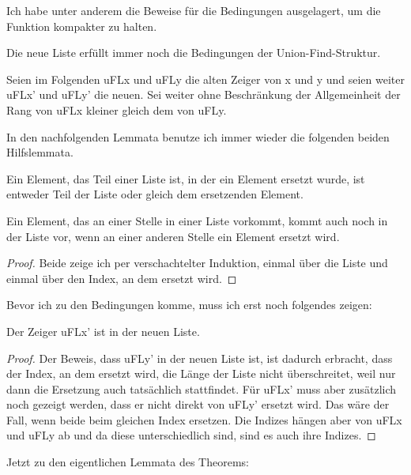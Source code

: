 Ich habe unter anderem die Beweise für die \KruskalunionFind Bedingungen ausgelagert, um die Funktion kompakter zu halten.

\begin{theorem}
  Die neue Liste erfüllt immer noch die Bedingungen der Union-Find-Struktur.
\end{theorem}

Seien im Folgenden uFLx und uFLy die alten Zeiger von x und y und seien weiter uFLx' und uFLy' die neuen.
Sei weiter ohne Beschränkung der Allgemeinheit der Rang von uFLx kleiner gleich dem von uFLy.

In den nachfolgenden Lemmata benutze ich immer wieder die folgenden beiden Hilfslemmata.

\begin{lemma}[\memoreqofmemset]\label{memoreqofmemset}
  Ein Element, das Teil einer Liste ist, in der ein Element ersetzt wurde, ist entweder Teil der Liste oder gleich dem ersetzenden Element.
\end{lemma}
\begin{lemma}[\memsetofneindex]
  Ein Element, das an einer Stelle in einer Liste vorkommt, kommt auch noch in der Liste vor, wenn an einer anderen Stelle ein Element ersetzt wird.
\end{lemma}
\begin{proof}
  Beide zeige ich per verschachtelter Induktion, einmal über die Liste und einmal über den Index, an dem ersetzt wird.
\end{proof}

Bevor ich zu den \KruskalunionFind Bedingungen komme, muss ich erst noch folgendes zeigen:

\begin{lemma}[\KruskalupdateunionFindhuFLxprimein]
  Der Zeiger uFLx' ist in der neuen Liste.
\end{lemma}
\begin{proof}
  Der Beweis, dass uFLy' in der neuen Liste ist, ist dadurch erbracht, dass der Index, an dem ersetzt wird, die Länge der Liste nicht überschreitet,
  weil nur dann die Ersetzung auch tatsächlich stattfindet.
  Für uFLx' muss aber zusätzlich noch gezeigt werden, dass er nicht direkt von uFLy' ersetzt wird.
  Das wäre der Fall, wenn beide beim gleichen Index ersetzen.
  Die Indizes hängen aber von uFLx und uFLy ab und da diese unterschiedlich sind, sind es auch ihre Indizes.
\end{proof}

Jetzt zu den eigentlichen Lemmata des Theorems:

